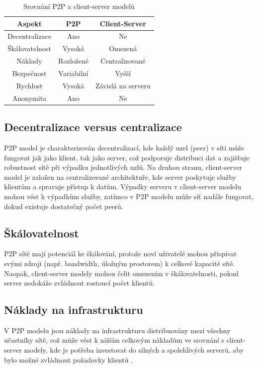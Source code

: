 \documentclass[10pt,twoside,czech,a4paper]{article}
\begin{document}
\begin{table}[H]
	\centering
	\begin{tabular}{|c|c|c|}
		\hline
		\textbf{Aspekt} & \textbf{P2P} & \textbf{Client-Server} \\
		\hline
		Decentralizace & Ano & Ne \\
		\hline
		Škálovatelnost & Vysoká & Omezená \\
		\hline
		Náklady & Rozložené & Centralizované \\
		\hline
		Bezpečnost & Variabilní & Vyšší \\
		\hline
		Rychlost & Vysoká & Závislá na serveru \\
		\hline
		Anonymita & Ano & Ne \\
		\hline
	\end{tabular}
	\caption{Srovnání P2P a client-server modelů}
\end{table}

\subsection{Decentralizace versus centralizace}

P2P model je charakterizován decentralizací, kde každý uzel (peer) v síti může fungovat jak jako klient, tak jako server, což podporuje distribuci dat a zajišťuje robustnost sítě při výpadku jednotlivých uzlů.
Na druhou stranu, client-server model je založen na centralizované architektuře, kde server poskytuje služby klientům a spravuje přístup k datům.
Výpadky serveru v client-server modelu mohou vést k výpadkům služby, zatímco v P2P modelu může síť nadále fungovat, dokud existuje dostatečný počet peerů.

\subsection{Škálovatelnost}

P2P sítě mají potenciál ke škálování, protože noví uživatelé mohou přispívat svými zdroji (např. bandwidth, úložným prostorem) k celkové kapacitě sítě.
Naopak, client-server modely mohou čelit omezením v škálovatelnosti, pokud server nedokáže zvládnout rostoucí počet klientů.

\subsection{Náklady na infrastrukturu}

V P2P modelu jsou náklady na infrastrukturu distribuovány mezi všechny učastníky sítě, což může vést k nižším celkovým nákladům ve srovnání s client-server modely, kde je potřeba investovat do silných a spolehlivých serverů, aby bylo možné zvládnout požadavky klientů \cite{Leibnitz2007}.
\end{document}

